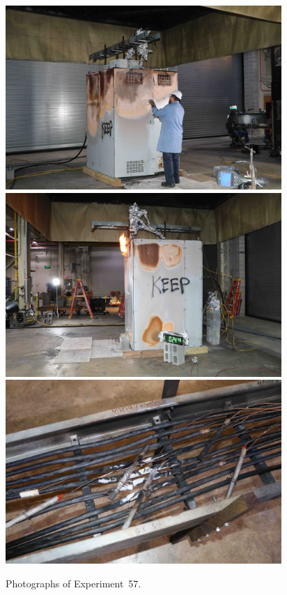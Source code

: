 \documentclass[12pt]{article}
\begin{document}
\begin{figure}[p]
\centering
\includegraphics[height=2.75in]{../FIGURES/Test_57_setup} \\
\includegraphics[height=2.75in]{../FIGURES/Test_57_24_min_46_s} \\
\includegraphics[height=2.75in]{../FIGURES/Test_57_scar}
\caption[Photographs of Experiment~57]{Photographs of Experiment~57.}
\label{fig:Test_57_photos}
\end{figure}


\clearpage
\end{document}
